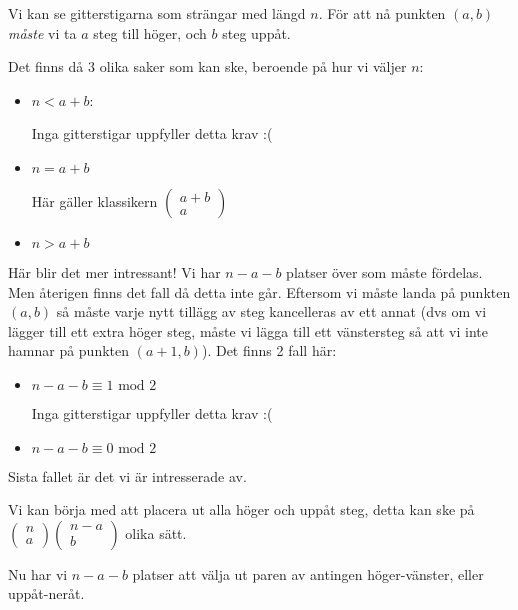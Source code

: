 \documentclass{tufte-handout}
\begin{document}
\begin{ans}
  \noindent Vi kan se gitterstigarna som strängar med längd $n$. För att nå punkten $(a,b)$ \textit{måste} vi ta $a$ steg till höger, och $b$ steg uppåt.
  \par\bigskip
  \noindent Det finns då 3 olika saker som kan ske, beroende på hur vi väljer $n$:\par
  \begin{itemize}
    \item $n < a+ b$:\par
      Inga gitterstigar uppfyller detta krav :(
    \item $n = a+b$\par
      Här gäller klassikern $\begin{pmatrix}a+b\\a\end{pmatrix}$
    \item $n>a+b$\par
  \end{itemize}
  \noindent Här blir det mer intressant! Vi har $n-a-b$ platser över som måste fördelas. Men återigen finns det fall då detta inte går. Eftersom vi måste landa på punkten $(a,b)$ så måste varje nytt tillägg av steg kancelleras av ett annat (dvs om vi lägger till ett extra höger steg, måste vi lägga till ett vänstersteg så att vi inte hamnar på punkten $(a+1,b)$). Det finns 2 fall här:\par
  \begin{itemize}
    \item $n-a-b\equiv1\text{ mod } 2$\par
      Inga gitterstigar uppfyller detta krav :( 
    \item $n-a-b\equiv0\text{ mod } 2$\par\par
  \end{itemize}\par
  \noindent Sista fallet är det vi är intresserade av.
  \par\bigskip
  \noindent Vi kan börja med att placera ut alla höger och uppåt steg, detta kan ske på $\begin{pmatrix}n\\a\end{pmatrix}\begin{pmatrix}n-a\\b\end{pmatrix}$ olika sätt.\par
  \noindent Nu har vi $n-a-b$ platser att välja ut paren av antingen höger-vänster, eller uppåt-neråt.\par

\end{ans}
\end{document}
